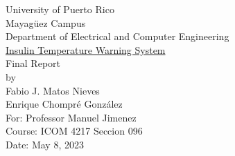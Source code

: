 \begin{titlepage}
  \begin{center}
    \large{University of Puerto Rico\\
    Mayagüez Campus\\
    \vspace{\baselineskip}
    Department of Electrical and Computer Engineering\\}
    \vspace{6cm}
    \Huge{\underline{Insulin Temperature Warning System}\\}
    \vspace{0.3\baselineskip}
    \large{Final Report\\}
    \vspace{0.8\baselineskip}
    \large by\\
    Fabio J. Matos Nieves\\
    Enrique Chompré González\\
    \vspace{5.5cm}
    For: Professor Manuel Jimenez\\
    Course: ICOM 4217 Seccion 096\\
    Date: May 8, 2023\\
    \normalsize

  \end{center}
\end{titlepage}

